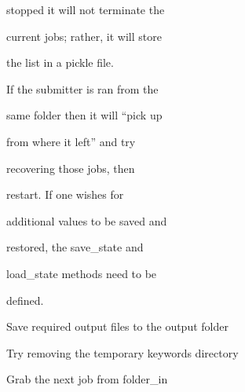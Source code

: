\documentclass[letterpaper,10pt,english]{sphinxmanual}
\begin{document}
\begin{fulllineitems}
\begin{DUlineblock}{0em}
\begin{DUlineblock}{\DUlineblockindent}
\begin{DUlineblock}{\DUlineblockindent}
\item[] stopped it will not terminate the
\item[] current jobs; rather, it will store
\item[] the list in a pickle file.
\item[] If the submitter is ran from the
\item[] same folder then it will ``pick up
\item[] from where it left'' and try
\item[] recovering those jobs, then
\item[] restart. If one wishes for
\item[] additional values to be saved and
\item[] restored, the save\_state and
\item[] load\_state methods need to be
\item[] defined.
\end{DUlineblock}
\end{DUlineblock}
\end{DUlineblock}

\begin{fulllineitems}
\label{doctree/soprano.hpc.submitter.castep:soprano.hpc.submitter.castep.CastepSubmitter.finish_job}
Save required output files to the output folder

\end{fulllineitems}


\begin{fulllineitems}
\label{doctree/soprano.hpc.submitter.castep:soprano.hpc.submitter.castep.CastepSubmitter.finish_run}
Try removing the temporary keywords directory

\end{fulllineitems}


\begin{fulllineitems}
\label{doctree/soprano.hpc.submitter.castep:soprano.hpc.submitter.castep.CastepSubmitter.next_job}
Grab the next job from folder\_in


\end{fulllineitems}
\end{fulllineitems}
\end{document}
